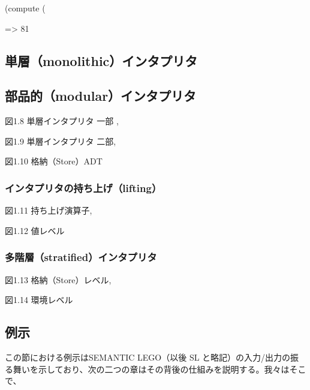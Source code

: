 \documentclass[11pt, oneside]{jsarticle}   	%
\begin{document}
(compute (%

=> 81













\subsection{単層（monolithic）インタプリタ}
\subsection{部品的（modular）インタプリタ}
図1.8 単層インタプリタ 一部 ,

図1.9 単層インタプリタ 二部,

図1.10 格納（Store）ADT


\subsubsection{インタプリタの持ち上げ（lifting）}
図1.11 持ち上げ演算子,

図1.12 値レベル

\subsubsection{多階層（stratified）インタプリタ}
図1.13 格納（Store）レベル,

図1.14 環境レベル


\subsection{例示}
この節における例示はSEMANTIC LEGO（以後 SL と略記）の入力/出力の振る舞いを示しており、次の二つの章はその背後の仕組みを説明する。我々はそこで、
\end{document}
